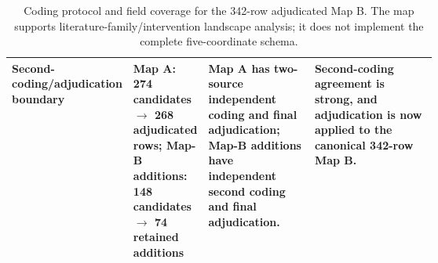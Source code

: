 \begin{table}[t]
\begin{tabularx}{\linewidth}{>{\raggedright\arraybackslash}p{0.22\linewidth}>{\raggedright\arraybackslash}p{0.16\linewidth}>{\raggedright\arraybackslash}p{0.25\linewidth}X}
Second-coding/adjudication boundary & Map A: 274 candidates $\rightarrow$ 268 adjudicated rows; Map-B additions: 148 candidates $\rightarrow$ 74 retained additions & Map A has two-source independent coding and final adjudication; Map-B additions have independent second coding and final adjudication. & Second-coding agreement is strong, and adjudication is now applied to the canonical 342-row Map B. \\
\bottomrule
\end{tabularx}
\caption{Coding protocol and field coverage for the 342-row adjudicated Map B. The map supports literature-family/intervention landscape analysis; it does not implement the complete five-coordinate schema.}
\label{tab:map-b-coding-coverage}
\end{table}

